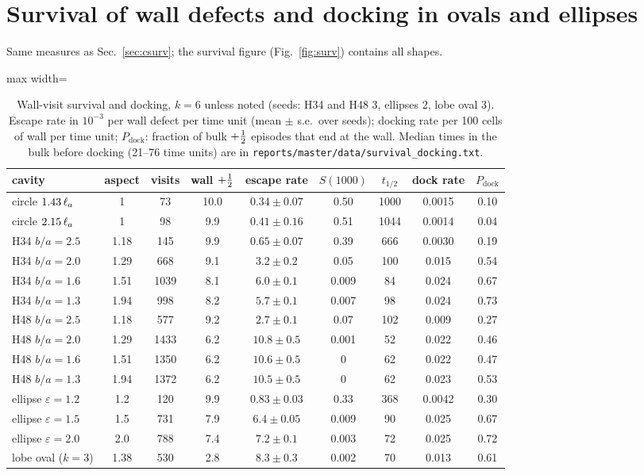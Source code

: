 \section{Survival of wall defects and docking in ovals and ellipses}\label{sec:ssurv}
Same measures as Sec.~\ref{sec:csurv}; the survival figure (Fig.~\ref{fig:surv}) contains all shapes.
\begin{table}[H]\centering\small
\caption{Wall-visit survival and docking, $k=6$ unless noted (seeds: H34 and H48 3, ellipses 2, lobe oval 3).
Escape rate in $10^{-3}$ per wall defect per time unit (mean $\pm$ s.e.\ over seeds); docking rate per 100 cells of wall per time
unit; $P_\mathrm{dock}$: fraction of bulk $+\tfrac12$ episodes that end at the wall. Median times in the bulk before docking (21--76 time units) are in \texttt{reports/master/data/survival\_docking.txt}.}\label{tab:ssurv}
\begin{adjustbox}{max width=\textwidth}
\begin{tabular}{lcccccccc}\toprule
cavity & aspect & visits & wall $+\tfrac12$ & escape rate & $S(1000)$ & $t_{1/2}$ & dock rate & $P_\mathrm{dock}$\\\midrule
circle $1.43\,\ell_a$ & 1 & 73 & 10.0 & $0.34\pm0.07$ & 0.50 & 1000 & 0.0015 & 0.10\\
circle $2.15\,\ell_a$ & 1 & 98 & 9.9 & $0.41\pm0.16$ & 0.51 & 1044 & 0.0014 & 0.04\\
H34 $b/a=2.5$ & 1.18 & 145 & 9.9 & $0.65\pm0.07$ & 0.39 & 666 & 0.0030 & 0.19\\
H34 $b/a=2.0$ & 1.29 & 668 & 9.1 & $3.2\pm0.2$ & 0.05 & 100 & 0.015 & 0.54\\
H34 $b/a=1.6$ & 1.51 & 1039 & 8.1 & $6.0\pm0.1$ & 0.009 & 84 & 0.024 & 0.67\\
H34 $b/a=1.3$ & 1.94 & 998 & 8.2 & $5.7\pm0.1$ & 0.007 & 98 & 0.024 & 0.73\\
H48 $b/a=2.5$ & 1.18 & 577 & 9.2 & $2.7\pm0.1$ & 0.07 & 102 & 0.009 & 0.27\\
H48 $b/a=2.0$ & 1.29 & 1433 & 6.2 & $10.8\pm0.5$ & 0.001 & 52 & 0.022 & 0.46\\
H48 $b/a=1.6$ & 1.51 & 1350 & 6.2 & $10.6\pm0.5$ & 0 & 62 & 0.022 & 0.47\\
H48 $b/a=1.3$ & 1.94 & 1372 & 6.2 & $10.5\pm0.5$ & 0 & 62 & 0.023 & 0.53\\
ellipse $\varepsilon=1.2$ & 1.2 & 120 & 9.9 & $0.83\pm0.03$ & 0.33 & 368 & 0.0042 & 0.30\\
ellipse $\varepsilon=1.5$ & 1.5 & 731 & 7.9 & $6.4\pm0.05$ & 0.009 & 90 & 0.025 & 0.67\\
ellipse $\varepsilon=2.0$ & 2.0 & 788 & 7.4 & $7.2\pm0.1$ & 0.003 & 72 & 0.025 & 0.72\\
lobe oval ($k=3$) & 1.38 & 530 & 2.8 & $8.3\pm0.3$ & 0.002 & 70 & 0.013 & 0.61\\\bottomrule
\end{tabular}
\end{adjustbox}
\end{table}
